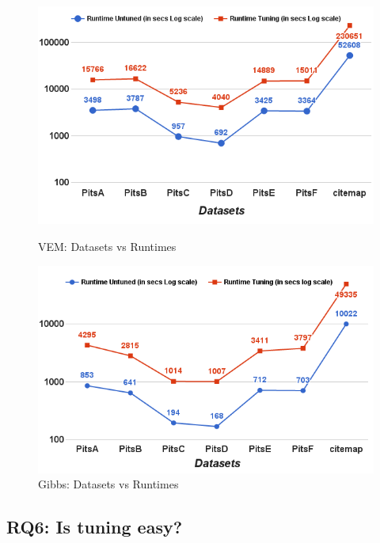 \documentclass[twocolumn,5p,sort&compress]{elsarticle}
\theoremstyle{break}
\begin{document}
\begin{figure}[!t]
    \centering
  \begin{minipage}{.49\textwidth}
        \captionsetup{labelsep=space,justification=centering}
        \includegraphics[width=\linewidth]{./fig/Run_VEM_sci.png}
  \caption{VEM: Datasets vs Runtimes}
  \label{RQ5 VEM}
  \end{minipage}
  \begin{minipage}{.49\textwidth}
        \captionsetup{justification=centering}
        \includegraphics[width=\linewidth]{./fig/Run_gibbs_sci.png}
  \caption{Gibbs: Datasets vs Runtimes}
  \label{RQ5 Gibbs}
    \end{minipage}%
    
\end{figure}

\subsection{\textbf{RQ6: Is  tuning  easy?}}
\end{document}
